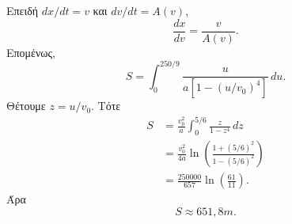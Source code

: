 \begin{alist}
  \item Επειδή $dx/dt=v$ και $dv/dt=A(v)$,
        \[
          \frac{dx}{dv}=\frac{v}{A(v)}.
        \]
        Επομένως,
        \[
          S=\int_0^{250/9}
          \frac{u}{a\left[1-(u/v_0)^4\right]}\,du.
        \]
        Θέτουμε $z=u/v_0$. Τότε
        \begin{align*}
          S
          &=\frac{v_0^2}{a}\int_0^{5/6}
            \frac{z}{1-z^4}\,dz\\
          &=\frac{v_0^2}{4a}
            \ln\left(
              \frac{1+(5/6)^2}{1-(5/6)^2}
            \right)\\
          &=\frac{250000}{657}\ln\left(\frac{61}{11}\right).
        \end{align*}
        Άρα
        \[
          {S\approx651{,}8\si{m}}.
        \]
\end{alist}
